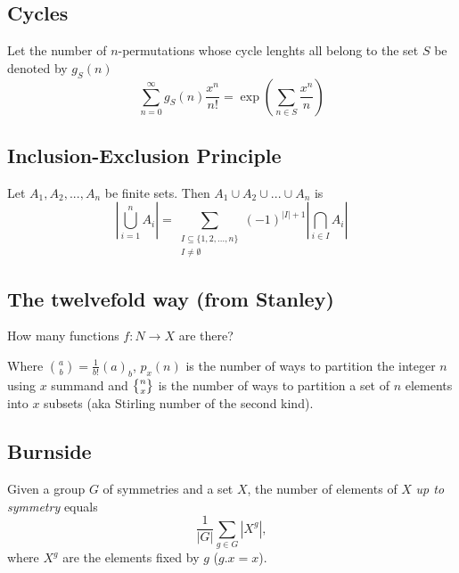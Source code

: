 \subsection{Cycles}
		Let the number of $n$-permutations whose cycle lenghts all belong to the set $S$ be denoted by $g_S (n)$
		\small
		$$\sum_{n=0} ^\infty g_S(n) \frac{x^n}{n!} = \exp\left(\sum_{n\in S} \frac{x^n}{n} \right)$$
		\normalsize

\subsection{Inclusion-Exclusion Principle}
	Let $A_1, A_2, ..., A_n$ be finite sets. Then  $A_1 \cup A_2 \cup ... \cup A_n$ is
	\[ \left| \bigcup^n_{i = 1} A_i \right|  = \sum_{\substack{I \subseteq \{1, 2, ..., n\}\\ I \neq \emptyset}}^{} (-1)^{\left| I \right| +1} \left| \bigcap\limits_{i\in I} A_i \right| \]

\subsection{The twelvefold way (from Stanley)} How many functions $f \colon N \rightarrow X$ are there?


  Where $\binom{a}{b} = \frac{1}{b!}(a)_b $, $p_x(n)$ is the number of ways to partition the integer $n$ using $x$ summand and $\stirlingsecond{n}{x}$ is the number of ways to partition a set of $n$ elements into $x$ subsets (aka Stirling number of the second kind).
	
\subsection{Burnside}
Given a group $G$ of symmetries and a set $X$, the number of elements of $X$ \emph{up to symmetry} equals
		 \[ {\frac {1}{|G|}}\sum _{{g\in G}}|X^{g}|, \]
		 where $X^{g}$ are the elements fixed by $g$ ($g.x = x$).

